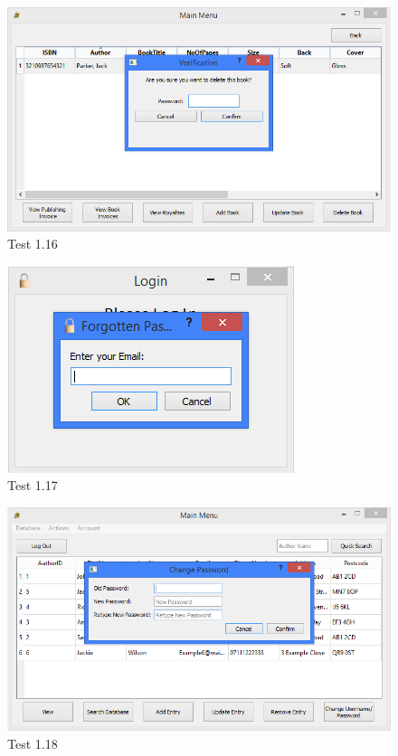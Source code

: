 \begin{landscape}
\begin{figure}[H]
    \includegraphics[width=\textwidth]{./Testing/Evidence/DeleteBookButtonTest.png}
    \caption{Test 1.16}  \label{fig:DeleteBookButtonTest}
\end{figure}

\begin{figure}[H]
    \includegraphics[width=\textwidth]{./Testing/Evidence/ForgotPasswordLabelTest.png}
    \caption{Test 1.17}  \label{fig:ForgotPasswordLabelTest}
\end{figure}

\begin{figure}[H]
    \includegraphics[width=\textwidth]{./Testing/Evidence/ChangePasswordButtonTest.png}
    \caption{Test 1.18}  \label{fig:ChangePasswordButtonTest}
\end{figure}


\end{landscape}
